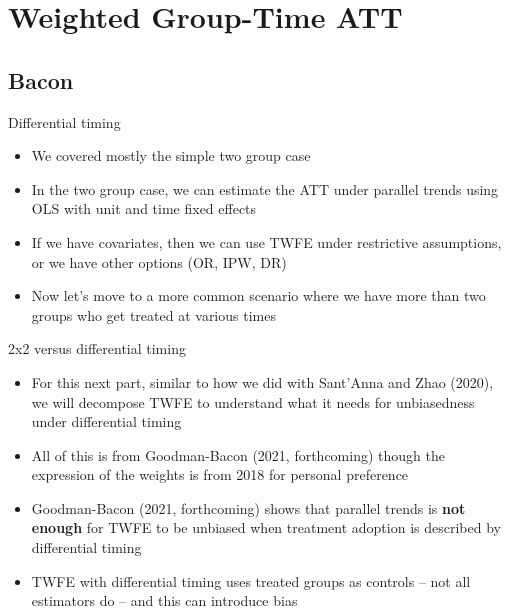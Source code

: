 \documentclass{beamer}
\begin{document}



\section{Weighted Group-Time ATT}

\subsection{Bacon}

\begin{frame}{Differential timing}

\begin{itemize}
\item We covered mostly the simple two group case
\item In the two group case, we can estimate the ATT under parallel trends using OLS with unit and time fixed effects
\item If we have covariates, then we can use TWFE under restrictive assumptions, or we have other options (OR, IPW, DR)
\item Now let's move to a more common scenario where we have more than two groups who get treated at various times
\end{itemize}

\end{frame}

\begin{frame}{2x2 versus differential timing}

\begin{itemize}
	\item For this next part, similar to how we did with Sant'Anna and Zhao (2020), we will decompose TWFE to understand what it needs for unbiasedness under differential timing
	\item All of this is from Goodman-Bacon (2021, forthcoming) though the expression of the weights is from 2018 for personal preference
	\item Goodman-Bacon (2021, forthcoming) shows that parallel trends is \textbf{not enough} for TWFE to be unbiased when treatment adoption is described by differential timing
	\item TWFE with differential timing uses treated groups as controls -- not all estimators do -- and this can introduce bias
\end{itemize}

\end{frame}
\end{document}
